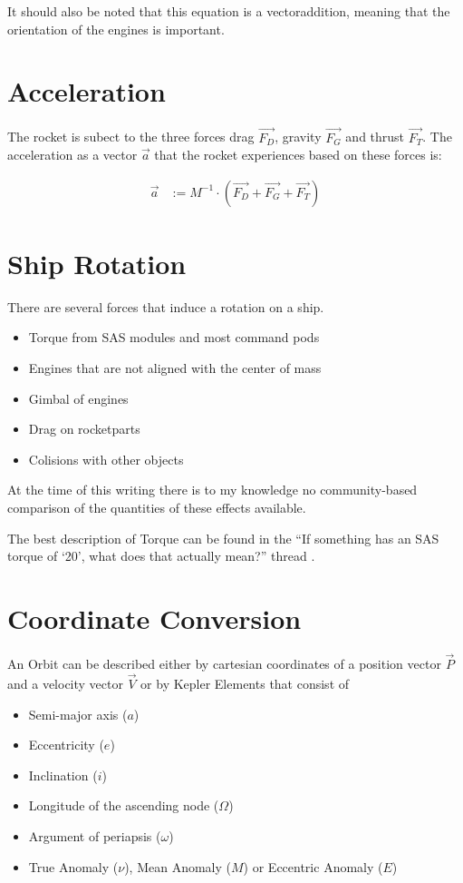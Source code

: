 \documentclass[11pt]{report}
\newcommand{\oa}[1]{\overrightarrow{#1}}
\newcommand{\F}[1]{\oa{F_{#1}}}
\newcommand{\Pos}{\oa{P}}
\newcommand{\Vel}{\oa{V}}
\begin{document}
It should also be noted that this equation is a vectoraddition,
meaning that the orientation of the engines is important.

\chapter{Acceleration}

The rocket is subect to the three forces drag $\F{D}$, gravity $\F{G}$
and thrust $\F{T}$.  The  acceleration as a vector
$\oa{a}$ that the rocket experiences based on these forces is:

\begin{align}
  \oa{a} &:= M^{-1} \cdot(\F{D} + \F{G} + \F{T})
\end{align}

\chapter{Ship Rotation}

There are several forces that induce a rotation on a ship.

\begin{itemize}
\item {} Torque from SAS modules and most command pods
\item Engines that are not aligned with the center of mass
\item {} Gimbal of engines
\item Drag on rocketparts
\item Colisions with other objects
\end{itemize}

At the time of this writing there is to my knowledge no
community-based comparison of the quantities of these effects
available.

The best description of Torque can be found in the ``If something has
an SAS torque of `20', what does that actually mean?'' thread
\cite{torque}.

\chapter{Coordinate Conversion}

An  Orbit can be described either by  cartesian coordinates of a position vector $\Pos$ and a
velocity vector $\Vel$ or by  Kepler Elements
\cite{Kepler} that consist of

\begin{itemize}
\item {} Semi-major axis ($a$)
\item {} Eccentricity ($e$)
\item {} Inclination ($i$)
\item {} Longitude of the ascending node ($\Omega$)
\item {} Argument of periapsis ($\omega$)
\item True Anomaly ($\nu$), Mean Anomaly ($M$) or Eccentric Anomaly ($E$)
\end{itemize}
\end{document}
